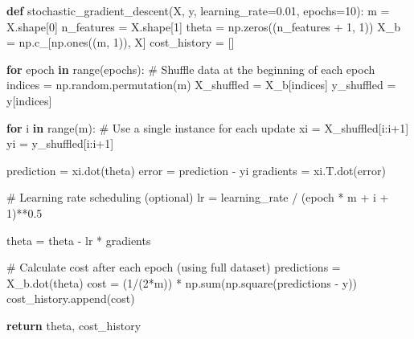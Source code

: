 \documentclass[
  letterpaper,
  DIV=11,
  numbers=noendperiod]{scrreprt}
\newenvironment{Shaded}{\begin{snugshade}}{\end{snugshade}}
\newcommand{\BuiltInTok}[1]{\textcolor[rgb]{0.00,0.23,0.31}{#1}}
\newcommand{\CommentTok}[1]{\textcolor[rgb]{0.37,0.37,0.37}{#1}}
\newcommand{\ControlFlowTok}[1]{\textcolor[rgb]{0.00,0.23,0.31}{\textbf{#1}}}
\newcommand{\DecValTok}[1]{\textcolor[rgb]{0.68,0.00,0.00}{#1}}
\newcommand{\FloatTok}[1]{\textcolor[rgb]{0.68,0.00,0.00}{#1}}
\newcommand{\KeywordTok}[1]{\textcolor[rgb]{0.00,0.23,0.31}{\textbf{#1}}}
\newcommand{\NormalTok}[1]{\textcolor[rgb]{0.00,0.23,0.31}{#1}}
\newcommand{\OperatorTok}[1]{\textcolor[rgb]{0.37,0.37,0.37}{#1}}
\begin{document}
\begin{Shaded}
\begin{Highlighting}[]
\KeywordTok{def}\NormalTok{ stochastic\_gradient\_descent(X, y, learning\_rate}\OperatorTok{=}\FloatTok{0.01}\NormalTok{, epochs}\OperatorTok{=}\DecValTok{10}\NormalTok{):}
\NormalTok{    m }\OperatorTok{=}\NormalTok{ X.shape[}\DecValTok{0}\NormalTok{]}
\NormalTok{    n\_features }\OperatorTok{=}\NormalTok{ X.shape[}\DecValTok{1}\NormalTok{]}
\NormalTok{    theta }\OperatorTok{=}\NormalTok{ np.zeros((n\_features }\OperatorTok{+} \DecValTok{1}\NormalTok{, }\DecValTok{1}\NormalTok{))}
\NormalTok{    X\_b }\OperatorTok{=}\NormalTok{ np.c\_[np.ones((m, }\DecValTok{1}\NormalTok{)), X]}
\NormalTok{    cost\_history }\OperatorTok{=}\NormalTok{ []}
    
    \ControlFlowTok{for}\NormalTok{ epoch }\KeywordTok{in} \BuiltInTok{range}\NormalTok{(epochs):}
        \CommentTok{\# Shuffle data at the beginning of each epoch}
\NormalTok{        indices }\OperatorTok{=}\NormalTok{ np.random.permutation(m)}
\NormalTok{        X\_shuffled }\OperatorTok{=}\NormalTok{ X\_b[indices]}
\NormalTok{        y\_shuffled }\OperatorTok{=}\NormalTok{ y[indices]}
        
        \ControlFlowTok{for}\NormalTok{ i }\KeywordTok{in} \BuiltInTok{range}\NormalTok{(m):}
            \CommentTok{\# Use a single instance for each update}
\NormalTok{            xi }\OperatorTok{=}\NormalTok{ X\_shuffled[i:i}\OperatorTok{+}\DecValTok{1}\NormalTok{]}
\NormalTok{            yi }\OperatorTok{=}\NormalTok{ y\_shuffled[i:i}\OperatorTok{+}\DecValTok{1}\NormalTok{]}
            
\NormalTok{            prediction }\OperatorTok{=}\NormalTok{ xi.dot(theta)}
\NormalTok{            error }\OperatorTok{=}\NormalTok{ prediction }\OperatorTok{{-}}\NormalTok{ yi}
\NormalTok{            gradients }\OperatorTok{=}\NormalTok{ xi.T.dot(error)}
            
            \CommentTok{\# Learning rate scheduling (optional)}
\NormalTok{            lr }\OperatorTok{=}\NormalTok{ learning\_rate }\OperatorTok{/}\NormalTok{ (epoch }\OperatorTok{*}\NormalTok{ m }\OperatorTok{+}\NormalTok{ i }\OperatorTok{+} \DecValTok{1}\NormalTok{)}\OperatorTok{**}\FloatTok{0.5}
            
\NormalTok{            theta }\OperatorTok{=}\NormalTok{ theta }\OperatorTok{{-}}\NormalTok{ lr }\OperatorTok{*}\NormalTok{ gradients}
            
        \CommentTok{\# Calculate cost after each epoch (using full dataset)}
\NormalTok{        predictions }\OperatorTok{=}\NormalTok{ X\_b.dot(theta)}
\NormalTok{        cost }\OperatorTok{=}\NormalTok{ (}\DecValTok{1}\OperatorTok{/}\NormalTok{(}\DecValTok{2}\OperatorTok{*}\NormalTok{m)) }\OperatorTok{*}\NormalTok{ np.}\BuiltInTok{sum}\NormalTok{(np.square(predictions }\OperatorTok{{-}}\NormalTok{ y))}
\NormalTok{        cost\_history.append(cost)}
        
    \ControlFlowTok{return}\NormalTok{ theta, cost\_history}
\end{Highlighting}
\end{Shaded}
\end{document}
